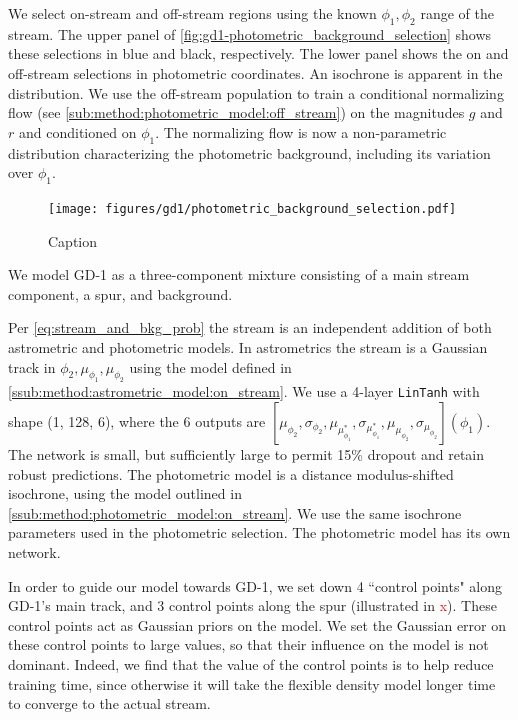 \documentclass[twocolumn]{aastex631}
\newcommand{\TODO}[1]{{\textcolor{red}{#1}}}
\begin{document}
{        
        We select on-stream and off-stream regions using the known $\phi_1,\phi_2$ range
        of the stream. The upper panel of \autoref{fig:gd1-photometric_background_selection}
        shows these selections in blue and black, respectively.
        The lower panel shows the on and off-stream selections in photometric
        coordinates. An isochrone is apparent in the distribution.
        We use the off-stream population to train a
        conditional normalizing flow (see \autoref{sub:method:photometric_model:off_stream})
        on the magnitudes $g$ and $r$ and conditioned on $\phi_1$.
        The normalizing flow is now a non-parametric distribution characterizing
        the photometric background, including its variation over $\phi_1$.

        \begin{figure}
            \centering
            \texttt{[image: figures/gd1/photometric\_background\_selection.pdf]}
            \caption{Caption}
            \label{fig:gd1-photometric_background_selection}
        \end{figure}

        We model GD-1 as a three-component mixture consisting of a main stream
        component, a spur, and background.

        Per \autoref{eq:stream_and_bkg_prob} the stream is an independent addition
        of both astrometric and photometric models.
        In astrometrics the stream is a Gaussian track in $\phi_2, \mu_{\phi_1}, \mu_{\phi_2}$
        using the model defined in \autoref{ssub:method:astrometric_model:on_stream}.
        We use a 4-layer \texttt{LinTanh} with shape (1, 128, 6), where the 6 outputs
        are $[\mu_{\phi_2}, \sigma_{\phi_2}, \mu_{\mu_{\phi_1}^*}, \sigma_{\mu_{\phi_1}^*}, \mu_{\mu_{\phi_2}}, \sigma_{\mu_{\phi_2}}](\phi_1)$. The network
        is small, but sufficiently large to permit 15\% dropout and retain robust
        predictions. The photometric model is a distance modulus-shifted isochrone,
        using the model outlined in \autoref{ssub:method:photometric_model:on_stream}.
        We use the same isochrone parameters used in the photometric selection.
        The photometric model has its own network.

        In order to guide our model towards
        GD-1, we set down 4 ``control points" along GD-1's main track, and 3
        control points along the spur (illustrated in \TODO{x}). These control
        points act as Gaussian priors on the model. We set the Gaussian error on
        these control points to large values, so that their influence on the
        model is not dominant. Indeed, we find that the value of the control
        points is to help reduce training time, since otherwise it will take the
        flexible density model longer time to converge to the actual stream.

}
\end{document}
